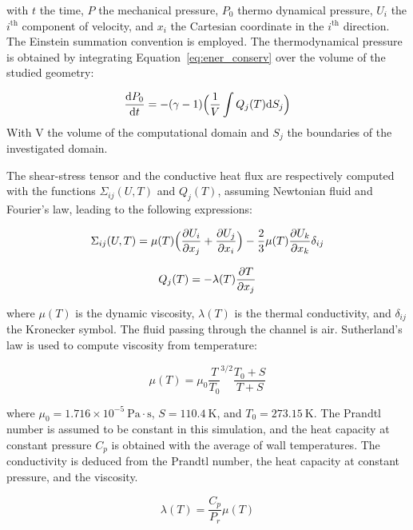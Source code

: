 with $t$ the time, $P$ the mechanical pressure, $P_0$ thermo dynamical pressure, $U_i$ the $i^{\text{th}}$ component of velocity, and $x_i$ the Cartesian coordinate in the $i^{\text{th}}$ direction. The Einstein summation convention is employed. The thermodynamical pressure is obtained by integrating Equation~\ref{eq:ener_conserv} over the volume of the studied geometry:

\begin{equation}
    \frac{\mathrm{d} P_0}{\mathrm{d} t} = -(\gamma -1) \Big( \frac{1}{V} \int Q_j({T}) \mathrm{d} S_j \Big)
\end{equation}
With V the volume of the computational domain and $S_j$ the boundaries of the investigated domain.

The shear-stress tensor and the conductive heat flux are respectively computed with the functions $\Sigma_{ij}({U}, {T})$ and $Q_j({T})$, assuming Newtonian fluid and Fourier's law, leading to the following expressions:

\begin{equation}
    \Sigma_{ij}({U}, {T}) = \mu ({T}) \Big( \frac{\partial {U_i}}{\partial x_j} + \frac{\partial {U_j}}{\partial x_i}\Big) - \frac{2}{3}\mu({T}) \frac{\partial {U_k}}{\partial x_k} \delta_{ij}
\end{equation}

\begin{equation}
    Q_j({T}) = - \lambda({T})\frac{\partial {T}}{\partial x_j}
\end{equation}

where $\mu(T)$ is the dynamic viscosity, $\lambda(T)$ is the thermal conductivity, and $\delta_{ij}$ the Kronecker symbol.
The fluid passing through the channel is air. Sutherland's law \cite{sutherland_viscosity_1893} is used to compute viscosity from temperature:

\begin{equation}
    \mu(T) = \mu_0 \frac{T}{T_0}^{3/2} \frac{T_0 + S}{T + S}
\end{equation}

where $\mu_0 = 1.716 \times 10^{-5} \ \text{Pa}\cdot\text{s}$, $S = 110.4 \ \text{K}$, and $T_0 = 273.15 \ \text{K}$. The Prandtl number is assumed to be constant in this simulation, and the heat capacity at constant pressure $C_p$ is obtained with the average of wall temperatures. The conductivity is deduced from the Prandtl number, the heat capacity at constant pressure, and the viscosity.

\begin{equation}
    \lambda(T) = \frac{C_p}{P_r} \mu(T)
\end{equation}

